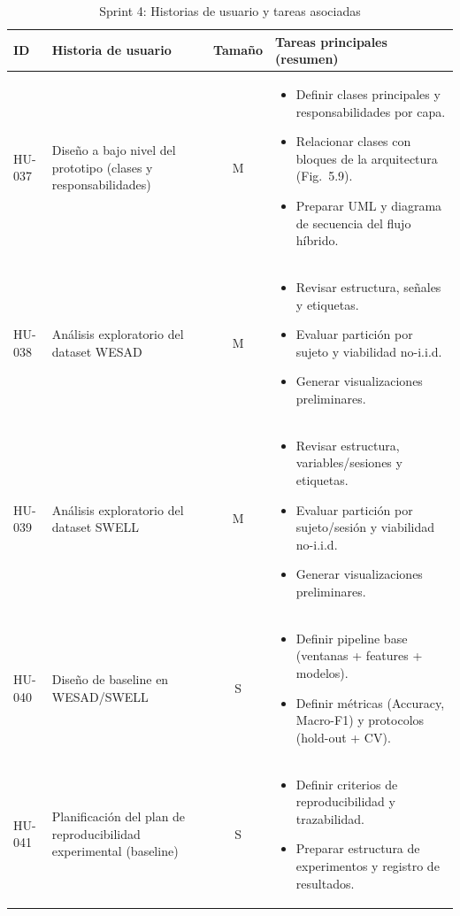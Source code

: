 \documentclass{report}
\begin{document}
\begin{table}[H]
\centering
\footnotesize
\caption{Sprint 4: Historias de usuario y tareas asociadas}
\label{tab:sprint4}
\renewcommand{\arraystretch}{1.25}
\setlength{\tabcolsep}{4pt}

\begin{tabular}{|l|p{4.7cm}|c|p{5.7cm}|}
\hline
\textbf{ID} & \textbf{Historia de usuario} & \textbf{Tamaño} & \textbf{Tareas principales (resumen)} \\ \hline

HU-037 &
Diseño a bajo nivel del prototipo (clases y responsabilidades) &
M &
\begin{itemize}\setlength\itemsep{0.2em}
  \item Definir clases principales y responsabilidades por capa.
  \item Relacionar clases con bloques de la arquitectura (Fig.~5.9).
  \item Preparar UML y diagrama de secuencia del flujo híbrido.
\end{itemize}
\\ \hline

HU-038 &
Análisis exploratorio del dataset WESAD &
M &
\begin{itemize}\setlength\itemsep{0.2em}
  \item Revisar estructura, señales y etiquetas.
  \item Evaluar partición por sujeto y viabilidad no-i.i.d.
  \item Generar visualizaciones preliminares.
\end{itemize}
\\ \hline

HU-039 &
Análisis exploratorio del dataset SWELL &
M &
\begin{itemize}\setlength\itemsep{0.2em}
  \item Revisar estructura, variables/sesiones y etiquetas.
  \item Evaluar partición por sujeto/sesión y viabilidad no-i.i.d.
  \item Generar visualizaciones preliminares.
\end{itemize}
\\ \hline

HU-040 &
Diseño de baseline en WESAD/SWELL &
S &
\begin{itemize}\setlength\itemsep{0.2em}
  \item Definir pipeline base (ventanas + features + modelos).
  \item Definir métricas (Accuracy, Macro-F1) y protocolos (hold-out + CV).
\end{itemize}
\\ \hline

HU-041 &
Planificación del plan de reproducibilidad experimental (baseline) &
S &
\begin{itemize}\setlength\itemsep{0.2em}
  \item Definir criterios de reproducibilidad y trazabilidad.
  \item Preparar estructura de experimentos y registro de resultados.
\end{itemize}
\\ \hline
\end{tabular}
\end{table}
\end{document}
